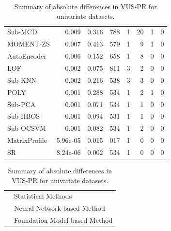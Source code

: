 \documentclass[12pt,oneside]{article}
\begin{document}
\begin{table}[htbp]
\begin{tabular}{lrrrrrrr}
        \rowcolor{lightgray} Sub-MCD & 0.009 & 0.316 & 788 & 1 & 20 & 1 & 0 \\
        \rowcolor{myLightGreen} MOMENT-ZS & 0.007 & 0.413 & 579 & 1 & 9 & 1 & 0 \\
        \rowcolor{myLightBlue} AutoEncoder & 0.006 & 0.152 & 658 & 1 & 8 & 0 & 0 \\
        \rowcolor{lightgray} LOF & 0.002 & 0.075 & 811 & 3 & 2 & 0 & 0 \\
        \rowcolor{lightgray} Sub-KNN & 0.002 & 0.216 & 538 & 3 & 3 & 0 & 0 \\
        \rowcolor{lightgray} POLY & 0.001 & 0.288 & 534 & 1 & 2 & 1 & 0 \\
        \rowcolor{lightgray} Sub-PCA & 0.001 & 0.071 & 534 & 1 & 1 & 0 & 0 \\
        \rowcolor{lightgray} Sub-HBOS & 0.001 & 0.094 & 531 & 1 & 1 & 0 & 0 \\
        \rowcolor{lightgray} Sub-OCSVM & 0.001 & 0.082 & 534 & 1 & 2 & 0 & 0 \\
        \rowcolor{lightgray} MatrixProfile & 5.96e-05 & 0.015 & 017 & 1 & 0 & 0 & 0 \\
        \rowcolor{lightgray} SR & 8.24e-06 & 0.002 & 534 & 1 & 0 & 0 & 0 \\
        \bottomrule
    \end{tabular}
    \par
    \vspace{1em}
    \noindent 
    \begin{tabular}{@{} p{1em} l @{}} 
        \rowcolor{lightgray} \strut & Statistical Methods \\
        \rowcolor{myLightBlue} \strut & Neural Network-based Method \\
        \rowcolor{myLightGreen} \strut & Foundation Model-based Method \\
        
    \end{tabular}
    \caption{\label{tab:Table 2} Summary of absolute differences in VUS-PR for univariate datasets.}
\end{table}
\end{document}

